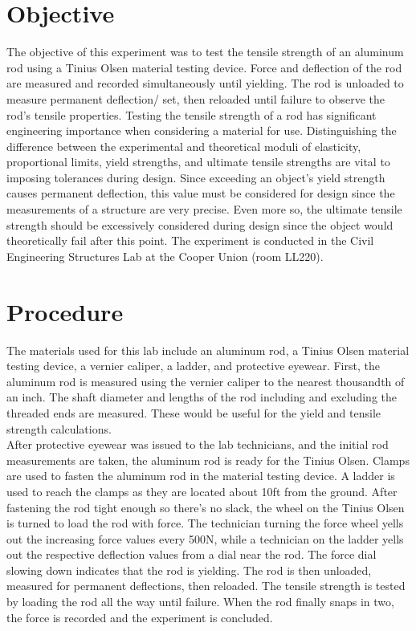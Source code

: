 \documentclass{article}
\begin{document}
    
    \doublespacing
    \tableofcontents
    \newpage
    \listoftables
    \listoffigures
    \newpage
    \section{Objective}
    \indent The objective of this experiment was to test the tensile strength of an aluminum rod using a Tinius Olsen material testing device.  Force and deflection of the rod are measured and recorded simultaneously until yielding. The rod is unloaded to measure permanent deflection/ set, then reloaded until failure to observe the rod's tensile properties. Testing the tensile strength of a rod has significant engineering importance when considering a material for use.  Distinguishing the difference between the experimental and theoretical moduli of elasticity, proportional limits,  yield strengths, and ultimate tensile strengths are vital to imposing tolerances during design. Since exceeding an object's yield strength causes permanent deflection, this value must be considered for design since the measurements of a structure are very precise. Even more so, the ultimate tensile strength should be excessively considered during design since the object would theoretically fail after this point.  The experiment is conducted in the Civil Engineering Structures Lab at the Cooper Union (room LL220).
    \newpage
    \section{Procedure}
    \indent The materials used for this lab include an aluminum rod, a Tinius Olsen material testing device, a vernier caliper, a ladder, and protective eyewear. First, the aluminum rod is measured using the vernier caliper to the nearest thousandth of an inch. The shaft diameter and lengths of the rod including and excluding the threaded ends are measured. These would be useful for the yield and tensile strength calculations.\\
    \indent After protective eyewear was issued to the lab technicians, and the initial rod measurements are taken, the aluminum rod is ready for the Tinius Olsen. Clamps are used to fasten the aluminum rod in the material testing device.  A ladder is used to reach the clamps as they are located about 10ft from the ground.  After fastening the rod tight enough so there's no slack, the wheel on the Tinius Olsen is turned to load the rod with force. The technician turning the force wheel yells out the increasing force values every 500N, while a technician on the ladder yells out the respective deflection values from a dial near the rod. The force dial slowing down indicates  that the rod is yielding. The rod is then unloaded, measured for permanent deflections, then reloaded. The tensile strength is tested by loading the rod all the way until failure. When the rod finally snaps in two, the force is recorded and the experiment is concluded. 
    \begin{center}
    
    \end{center}
    \newpage
\end{document}
